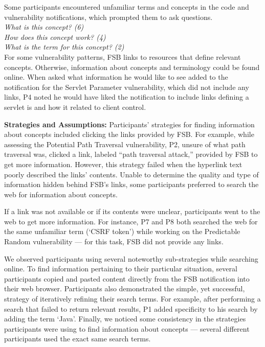 \documentclass[10pt,journal,compsoc]{IEEEtran}
\begin{document}
Some participants encountered unfamiliar terms and concepts in the code and vulnerability notifications, which prompted them to ask questions.
\\

\noindent\emph{What is this concept? (6)} \\
\emph{How does this concept work? (4)} \\
\emph{What is the term for this concept? (2)}
\\


For some vulnerability patterns, FSB links to resources that define relevant concepts.
Otherwise, information about concepts and terminology could be found online.
When asked what information he would like to see added to the notification for the Servlet Parameter vulnerability, which did not include any links, P4 noted he would have liked the notification to include links defining a servlet is and how it related to client control.


\textbf{Strategies and Assumptions:}
Participants' strategies for finding information about concepts included clicking the links provided by FSB.
For example, while assessing the Potential Path Traversal vulnerability, P2, unsure of what path traversal was, clicked a link, labeled ``path traversal attack,'' provided by FSB to get more information.
However, this strategy failed when the hyperlink text poorly described the links' contents.
Unable to determine the quality and type of information hidden behind FSB's links, some participants preferred to search the web for information about concepts.

If a link was not available or if its contents were unclear, participants went to the web to get more information.
For instance, P7 and P8 both searched the web for the same unfamiliar term (`CSRF token') while working on the Predictable Random vulnerability --- for this task, FSB did not provide any links.

We observed participants using several noteworthy sub-strategies while searching online.
To find information pertaining to their particular situation, several participants copied and pasted content directly from the FSB notification into their web browser.
Participants also demonstrated the simple, yet successful, strategy of iteratively refining their search terms. 
For example, after performing a search that failed to return relevant results, P1 added specificity to his search by adding the term `Java'.
Finally, we noticed some consistency in the strategies participants were using to find information about concepts --- several different participants used the exact same search terms. 
\end{document}
